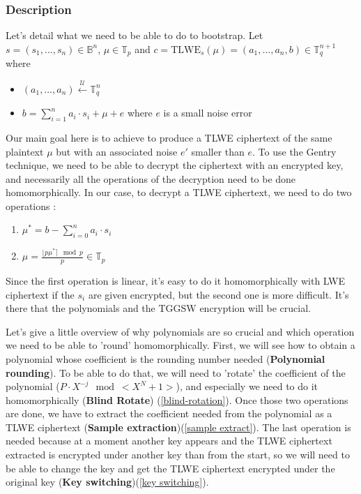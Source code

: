 \documentclass{article}
\newcommand{\T}{\mathbb{T}}
\newcommand{\B}{\mathbb{B}}
\newcommand{\Sunif}{\xleftarrow{\mathcal{U}}}
\newcommand{\round}[1]{\lfloor#1\rceil}
\theoremstyle{definition}
\theoremstyle{Theorem}
\begin{document}
\subsubsection{Description}

Let's detail what we need to be able to do to bootstrap. Let $s=(s_1,\ldots,s_n)\in\B^n$, $\mu\in\T_p$ and $c = \text{TLWE}_s(\mu) = (a_1,\ldots,a_n,b)\in\T_q^{n+1}$ where 
\begin{itemize}
    \item $(a_1,\ldots,a_n) \Sunif \T_q^{n}$
    \item $b = \sum_{i=1}^{n} a_i\cdot s_i + \mu + e$ where $e$ is a small noise error
\end{itemize}

Our main goal here is to achieve to produce a TLWE ciphertext of the same plaintext $\mu$ but with an associated noise $e'$ smaller than $e$. To use the Gentry technique, we need to be able to decrypt the ciphertext with an encrypted key, and necessarily all the operations of the decryption need to be done homomorphically. In our case, to decrypt a TLWE ciphertext, we need to do two operations : 

\begin{enumerate}
    \item $\mu^* = b - \sum_{i=0}^n a_i\cdot s_i$
    \item $\mu = \frac{\round{p\mu^*}\mod p}{p}\in\T_p$
\end{enumerate}

Since the first operation is linear, it's easy to do it homomorphically with LWE ciphertext if the $s_i$ are given encrypted, but the second one is more difficult. It's there that the polynomials and the TGGSW encryption will be crucial. 

Let's give a little overview of why polynomials are so crucial and which operation we need to be able to 'round' homomorphically. First, we will see how to obtain a polynomial whose coefficient is the rounding number needed (\textbf{Polynomial rounding}). To be able to do that, we will need to 'rotate' the coefficient of the polynomial ($P\cdot X^{-j}\mod <X^N+1>$), and especially we need to do it homomorphically (\textbf{Blind Rotate}) (\ref{blind-rotation}). Once those two operations are done, we have to extract the coefficient needed from the polynomial as a TLWE ciphertext (\textbf{Sample extraction})(\ref{sample extract}). The last operation is needed because at a moment another key appears and the TLWE ciphertext extracted is encrypted under another key than from the start, so we will need to be able to change the key and get the TLWE ciphertext encrypted under the original key (\textbf{Key switching})(\ref{key switching}).
\end{document}

